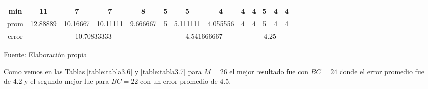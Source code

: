 \begin{center}
\begin{table}[H]
{\begin{tabular}{|c|c|c|c|c|c|c|c|c|c|c|c|c|c|}
\hline 
min & 
11 & 7 & 7 & 8 & 5 & 5 & 4 & 4 & 4 & 5 & 4 & 4 \\
\hline 
prom & 
12.88889 & 10.16667 & 10.11111 & 9.666667 & 5 & 5.111111 & 4.055556 & 4 & 4 & 5 & 4 & 4 \\
\hline 
error & 
\multicolumn{4}{c|}{10.70833333} & 
\multicolumn{4}{c|}{4.541666667} & 
\multicolumn{4}{c|}{4.25}\\ 
\hline 
\end{tabular} 
}
\begin{center}
\vskip 0.2cm
{\small{Fuente: Elaboración propia}}
\end{center}
\end{table}
\end{center}

\vskip -0.5cm
Como vemos en las Tablas \ref{table:tabla3.6} y \ref{table:tabla3.7} para $M = 26$ el mejor resultado fue con $BC = 24$ donde el error promedio fue de 4.2 y el segundo mejor fue para $BC = 22$ con un error promedio de 4.5.
\vskip -0.5cm

